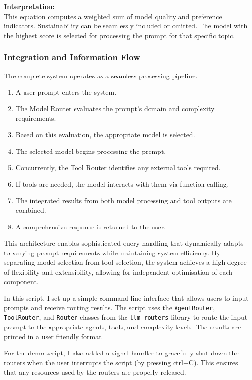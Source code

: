 \noindent
    \textbf{Interpretation:} \\
    This equation computes a weighted sum of model quality and preference indicators. Sustainability can be seamlessly included or omitted. The model with the highest score is selected for processing the prompt for that specific topic.
    
\subsubsection{Integration and Information Flow}

The complete system operates as a seamless processing pipeline:

\begin{enumerate}
    \item A user prompt enters the system.
    \item The Model Router evaluates the prompt's domain and complexity requirements.
    \item Based on this evaluation, the appropriate model is selected.
    \item The selected model begins processing the prompt.
    \item Concurrently, the Tool Router identifies any external tools required.
    \item If tools are needed, the model interacts with them via function calling.
    \item The integrated results from both model processing and tool outputs are combined.
    \item A comprehensive response is returned to the user.
\end{enumerate}

This architecture enables sophisticated query handling that dynamically adapts to varying prompt requirements while maintaining system efficiency. By separating model selection from tool selection, the system achieves a high degree of flexibility and extensibility, allowing for independent optimisation of each component.

In this script, I set up a simple command line interface that allows users to input prompts and receive routing results. The script uses the \texttt{AgentRouter}, \texttt{ToolRouter}, and \texttt{Router} classes from the \texttt{llm\_routers} library to route the input prompt to the appropriate agents, tools, and complexity levels. The results are printed in a user friendly format.

For the demo script, I also added a signal handler to gracefully shut down the routers when the user interrupts the script (by pressing ctrl+C). This ensures that any resources used by the routers are properly released.

